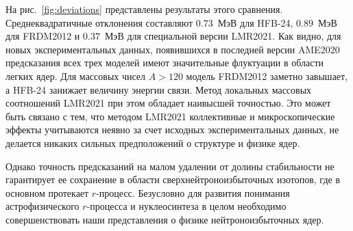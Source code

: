 На рис.~\ref{fig:deviations} представлены результаты этого сравнения. Среднеквадратичные отклонения составляют $0.73$~МэВ для HFB-24, $0.89$~МэВ для FRDM2012 и $0.37$~МэВ для специальной версии LMR2021. Как видно, для новых экспериментальных данных, появившихся в последней версии AME2020
предсказания всех трех моделей имеют значительные флуктуации в области легких ядер. Для массовых чисел $A > 120$ модель FRDM2012 заметно завышает, а HFB-24 занижает величину энергии связи. Метод локальных массовых соотношений LMR2021 при этом обладает наивысшей точностью. Это может быть связано с тем, что методом LMR2021 коллективные и микроскопические эффекты учитываются неявно за счет исходных экспериментальных данных, не делается никаких сильных предположений о структуре и физике ядер. 

Однако точность предсказаний на малом удалении от долины стабильности не гарантирует ее сохранение в области сверхнейтроноизбыточных изотопов, где в основном протекает $r$-процесс. Безусловно для развития понимания астрофизического $r$-процесса и нуклеосинтеза в целом необходимо совершенствовать наши представления о физике нейтроноизбыточных ядер.

